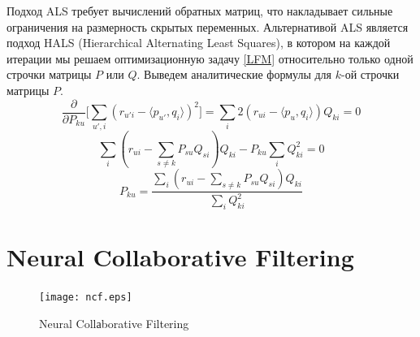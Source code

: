 \documentclass[12pt,a4paper]{article}
\begin{document}
Подход ALS требует вычислений обратных матриц, что накладывает сильные ограничения на размерность скрытых переменных. Альтернативой ALS является подход HALS (Hierarchical Alternating Least Squares), в котором на каждой итерации мы решаем оптимизационную задачу \eqref{LFM} относительно только одной строчки матрицы $P$ или $Q$. Выведем аналитические формулы для $k$-ой строчки матрицы $P$.
\[
	\frac{\partial}{\partial P_{ku}} \bigg[ \sum_{u',i} (r_{u'i} - \langle p_{u'}, q_i \rangle)^2 \bigg] = \sum_{i} 2(r_{ui} - \langle p_u, q_i \rangle)Q_{ki} = 0
\]
\[
	\sum_{i} (r_{ui} - \sum_{s\neq k} P_{su} Q_{si} )Q_{ki} - P_{ku}\sum_i Q_{ki}^2 = 0
\]
\[
	P_{ku} = \frac{\sum_{i} (r_{ui} - \sum_{s\neq k} P_{su} Q_{si} )Q_{ki}}{\sum_i Q_{ki}^2}
\]
%

\section{Neural Collaborative Filtering}

\begin{figure}[h!]
\centering
\texttt{[image: ncf.eps]}
\caption{Neural Collаborative Filtering}
\label{ncf}
\end{figure}
\end{document}
